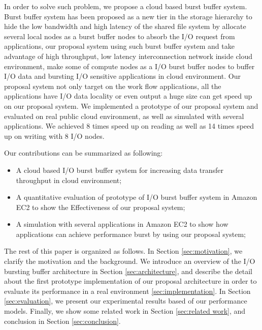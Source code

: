 In order to solve such problem, we propose a cloud based burst buffer system. Burst buffer system
has been proposed as a new tier in the storage hierarchy to hide the low bandwidth and high latency
of the shared file system by allocate several local nodes as a burst buffer nodes to absorb the I/O
request from applications, our proposal system using such burst buffer system and take advantage of
high throughput, low latency interconnection network inside cloud environment, make some of compute nodes as a I/O burst buffer nodes to buffer I/O data and bursting I/O sensitive applications in cloud environment.
Our proposal system not only target on the work flow applications, all the applications have
I/O data locality or even output a huge size can get speed up on our proposal system.
We implemented a prototype of our proposal system and evaluated on real public cloud environment, as
well as simulated with several applications.
We achieved 8 times speed up on reading as well as 14 times speed up on writing with 8 I/O nodes.

Our contributions can be summarized as following:
\begin{itemize}
	\item A cloud based I/O burst buffer system for increasing data transfer throughput in cloud environment;
	\item A quantitative evaluation of prototype of I/O burst buffer system in Amazon EC2 to show the
	Effectiveness of our proposal system;
    \item A simulation with several applications in Amazon EC2 to show how applications can achieve
    performance burst by using our proposal system;
\end{itemize}
The rest of this paper is organized as follows. 
In Section \ref{sec:motivation}, we clarify the motivation and the background.
We introduce an overview of the I/O bursting buffer architecture in Section \ref{sec:architecture}, 
and describe the detail about the first prototype implementation of our proposal architecture in order to evaluate its performance in a real environment \ref{sec:implementation}. 
In Section \ref{sec:evaluation}, we present our experimental results based of our performance models. %
Finally, we show some related work in Section \ref{sec:related work}, and conclusion in Section \ref{sec:conclusion}.
